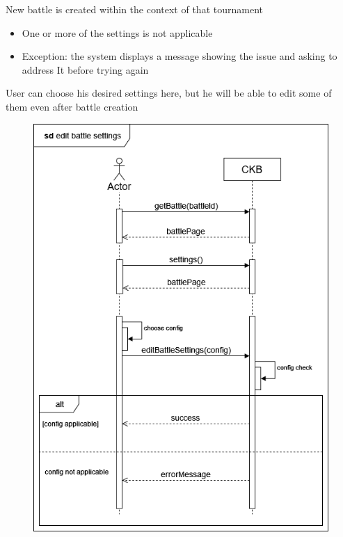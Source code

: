 {New battle is created within the context of that tournament} %
{ %
    \begin{itemize}
        \item One or more of the settings is not applicable
    \end{itemize}
}
{ %
    \begin{itemize}
        \item Exception: the system displays a message showing the issue and asking to address It before trying again
    \end{itemize} 
    User can choose his desired settings here, but he will be able to edit some of them even after battle creation
}

\usecase
{
    \begin{figure}[H]
        \centering
        \includegraphics[width=\textwidth]{src/sequence_diagrams/managebattsetts.png}
    \end{figure}
}
